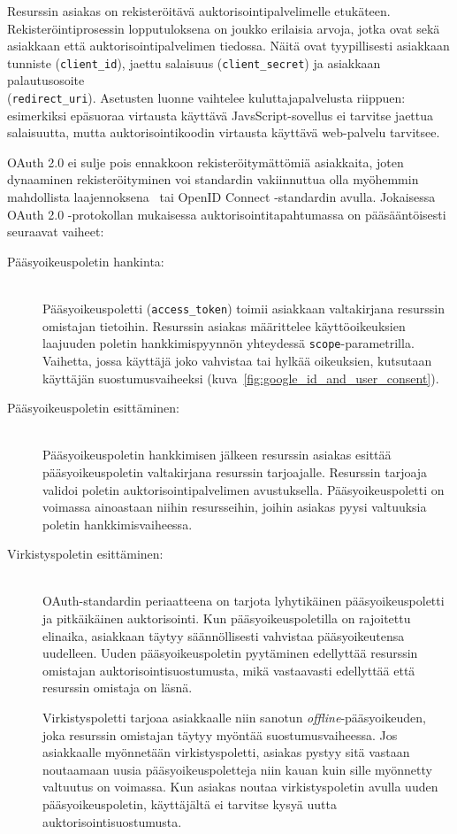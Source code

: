 \documentclass[finnish,gradu]{tktltiki}
\begin{document}
   Resurssin asiakas on rekisteröitävä auktorisointipalvelimelle etukäteen. Rekisteröintiprosessin lopputuloksena on joukko erilaisia arvoja, jotka ovat sekä asiakkaan että auktorisointipalvelimen tiedossa. Näitä ovat tyypillisesti asiakkaan tunniste (\verb!client_id!), jaettu salaisuus (\verb!client_secret!) ja asiakkaan pa\-lau\-tus\-osoite
   \\ (\verb!redirect_uri!). Asetusten luonne vaihtelee kuluttajapalvelusta riippuen: esimerkiksi epäsuoraa virtausta käyttävä JavsScript-sovellus ei tarvitse jaettua salaisuutta, mutta auktorisointikoodin virtausta käyttävä web-palvelu tarvitsee.

  OAuth 2.0 ei sulje pois ennakkoon rekisteröitymättömiä asiakkaita, joten dynaaminen rekisteröityminen voi standardin vakiinnuttua olla myöhemmin mahdollista laajennoksena~\cite{ietf_oauth2_unregistered_clients} tai OpenID Connect -standardin avulla. Jokaisessa OAuth 2.0 -protokollan mukaisessa auktorisointitapahtumassa on pääsääntöisesti seuraavat vaiheet:

  \begin{description}

  \item[Pääsyoikeuspoletin hankinta:] \hfill \\
  Pääsyoikeuspoletti (\verb!access_token!) toimii asiakkaan valtakirjana resurssin omistajan tietoihin. Resurssin asiakas määrittelee käyttöoikeuksien laajuuden poletin hankkimispyynnön yhteydessä \verb!scope!-parametrilla. Vaihetta, jossa käyttäjä joko vahvistaa tai hylkää oikeuksien, kutsutaan käyttäjän suostumusvaiheeksi (kuva~\ref{fig:google_id_and_user_consent}).

  \item[Pääsyoikeuspoletin esittäminen:] \hfill \\
  Pääsyoikeuspoletin hankkimisen jälkeen resurssin asiakas esittää pääsyoikeuspoletin valtakirjana resurssin tarjoajalle. Resurssin tarjoaja validoi poletin auktorisointipalvelimen avustuksella. Pääsyoikeuspoletti on voimassa ainoastaan niihin resursseihin, joihin asiakas pyysi valtuuksia poletin hankkimisvaiheessa.

  \item[Virkistyspoletin esittäminen:] \hfill \\
  OAuth-standardin periaatteena on tarjota lyhytikäinen pääsyoikeuspoletti ja pitkäikäinen auktorisointi. Kun pääsyoikeuspoletilla on rajoitettu elinaika, asiakkaan täytyy säännöllisesti vahvistaa pääsyoikeutensa uudelleen. Uuden pääsyoikeuspoletin pyytäminen edellyttää resurssin omistajan auktorisointisuostumusta, mikä vastaavasti edellyttää että resurssin omistaja on läsnä.

  Virkistyspoletti tarjoaa asiakkaalle niin sanotun \emph{offline}-pääsyoikeuden, joka resurssin omistajan täytyy myöntää suostumusvaiheessa. Jos asiakkaalle myönnetään virkistyspoletti, asiakas pystyy sitä vastaan noutaamaan uusia pääsyoikeuspoletteja niin kauan kuin sille myönnetty valtuutus on voimassa. Kun asiakas noutaa virkistyspoletin avulla uuden pääsyoikeuspoletin, käyttäjältä ei tarvitse kysyä uutta auktorisointisuostumusta.

  \end{description}
\end{document}
